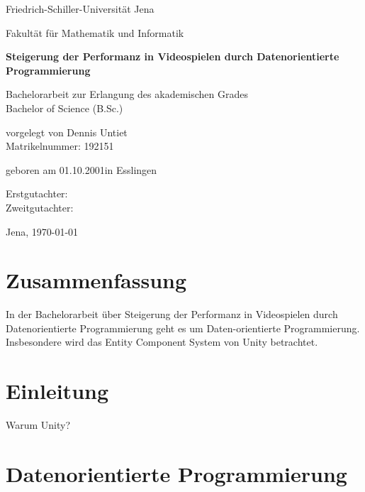 \documentclass[12pt, titlepage]{article}
\DeclareRobustCommand{\#}{\adjustbox{valign=B,totalheight=.57\baselineskip}{\oldhash}}%
\newcommand{\myTitle}{Steigerung der Performanz in Videospielen durch Datenorientierte Programmierung}
\begin{document}
\begin{titlepage}
\centering
{\huge Friedrich-Schiller-Universität Jena \par}
{\large Fakultät für Mathematik und Informatik\par}
\vspace{1.5cm}
{\huge\bfseries \myTitle\par}
\vspace{2cm}
{\Large Bachelorarbeit zur Erlangung des akademischen Grades\\Bachelor of Science (B.Sc.) \par}
\vspace{3cm}
{\large vorgelegt von Dennis Untiet\\Matrikelnummer: 192151\par}
\vspace{0.5cm}
{\large geboren am 01.10.2001\quad in Esslingen\par}
\vspace{2cm}
{\large Erstgutachter:\\Zweitgutachter:\par} 
\vfill
{\Large Jena, \today}
\end{titlepage}
\newpage 
\thispagestyle{empty}
\quad
\newpage
\thispagestyle{empty}
\section*{Zusammenfassung}
In der Bachelorarbeit über {\myTitle} geht es um Daten-orientierte Programmierung. Insbesondere wird das Entity Component System von Unity betrachtet.
\newpage
\thispagestyle{empty}
\quad
\newpage
\tableofcontents
\newpage 
\thispagestyle{empty}
\quad
\newpage
\section{Einleitung}
Warum Unity?
\newpage
\section{Datenorientierte Programmierung}
\end{document}
